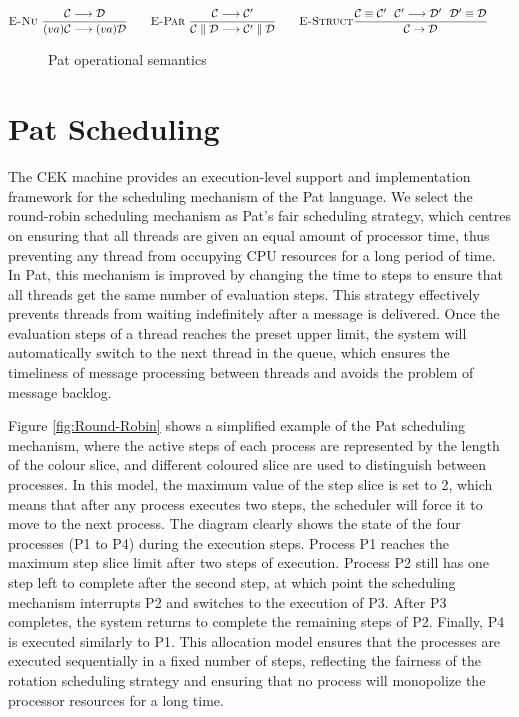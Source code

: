 \documentclass{l4proj}
\begin{document}
\vspace{-1\baselineskip} 
\begin{align*}
 \textsc{E-Nu}\ \frac{\mathcal{C} \longrightarrow \mathcal{D}}{(va)\mathcal{C} \longrightarrow (va)\mathcal{D}} \quad \quad \textsc{E-Par} \ \frac{\mathcal{C} \longrightarrow \mathcal{C'}}{\mathcal{C} \parallel \mathcal{D} \longrightarrow \mathcal{C'} \parallel \mathcal{D}} & \quad \quad \textsc{E-Struct} \frac{\mathcal{C} \equiv \mathcal{C'} \ \ \mathcal{C'} \longrightarrow \mathcal{D'} \ \ \mathcal{D'} \equiv \mathcal{D}}{\mathcal{C} \rightarrow \mathcal{D}} & & & \\
\end{align*}
\vspace{-2\baselineskip} 
\begin{figure}[ht]
    \caption{Pat operational semantics}
    \label{fig:Semantics}
\end{figure}


\section{Pat Scheduling}
The CEK machine provides an execution-level support and implementation framework for the scheduling mechanism of the Pat language. We select the round-robin scheduling mechanism as Pat's fair scheduling strategy, which centres on ensuring that all threads are given an equal amount of processor time, thus preventing any thread from occupying CPU resources for a long period of time. In Pat, this mechanism is improved by changing the time to steps to ensure that all threads get the same number of evaluation steps. This strategy effectively prevents threads from waiting indefinitely after a message is delivered. Once the evaluation steps of a thread reaches the preset upper limit, the system will automatically switch to the next thread in the queue, which ensures the timeliness of message processing between threads and avoids the problem of message backlog.

Figure \ref{fig:Round-Robin} shows a simplified example of the Pat scheduling mechanism, where the active steps of each process are represented by the length of the colour slice, and different coloured slice are used to distinguish between processes. In this model, the maximum value of the step slice is set to 2, which means that after any process executes two steps, the scheduler will force it to move to the next process. The diagram clearly shows the state of the four processes (P1 to P4) during the execution steps. Process P1 reaches the maximum step slice limit after two steps of execution. Process P2 still has one step left to complete after the second step, at which point the scheduling mechanism interrupts P2 and switches to the execution of P3. After P3 completes, the system returns to complete the remaining steps of P2. Finally, P4 is executed similarly to P1. This allocation model ensures that the processes are executed sequentially in a fixed number of steps, reflecting the fairness of the rotation scheduling strategy and ensuring that no process will monopolize the processor resources for a long time.
\end{document}

